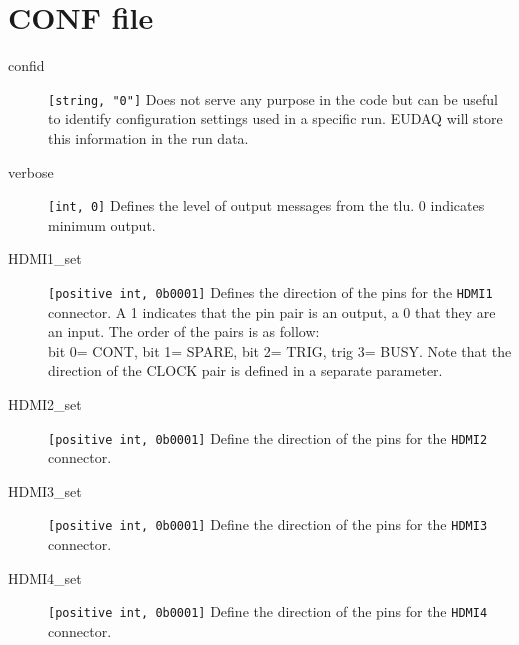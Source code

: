 \section{CONF file}
\begin{description}
  \item[confid] \verb|[string, "0"]| Does not serve any purpose in the code but can be useful to identify configuration settings used in a specific run. EUDAQ will store this information in the run data.
  \item[verbose] \verb|[int, 0]| Defines the level of output messages from the \gls{tlu}. 0 indicates minimum output.
  \item[HDMI1\_set] \verb|[positive int, 0b0001]| Defines the direction of the pins for the \verb|HDMI1| connector. A 1 indicates that the pin pair is an output, a 0 that they are an input. The order of the pairs is as follow:\\
  bit 0= CONT, bit 1= SPARE, bit 2= TRIG, trig 3= BUSY. Note that the direction of the CLOCK pair is defined in a separate parameter.
  \item[HDMI2\_set] \verb|[positive int, 0b0001]| Define the direction of the pins for the \verb|HDMI2| connector.
  \item[HDMI3\_set] \verb|[positive int, 0b0001]| Define the direction of the pins for the \verb|HDMI3| connector.
  \item[HDMI4\_set] \verb|[positive int, 0b0001]| Define the direction of the pins for the \verb|HDMI4| connector.
\end{description} 